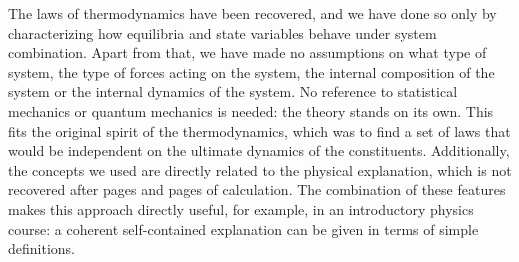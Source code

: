 \documentclass[letterpaper,twocolumn]{article}
\begin{document}
The laws of thermodynamics have been recovered, and we have done so only by characterizing how equilibria and state variables behave under system combination. Apart from that, we have made no assumptions on what type of system, the type of forces acting on the system, the internal composition of the system or the internal dynamics of the system. No reference to statistical mechanics or quantum mechanics is needed: the theory stands on its own. This fits the original spirit of the thermodynamics, which was to find a set of laws that would be independent on the ultimate dynamics of the constituents. Additionally, the concepts we used are directly related to the physical explanation, which is not recovered after pages and pages of calculation. The combination of these features makes this approach directly useful, for example, in an introductory physics course: a coherent self-contained explanation can be given in terms of simple definitions.





\end{document}
